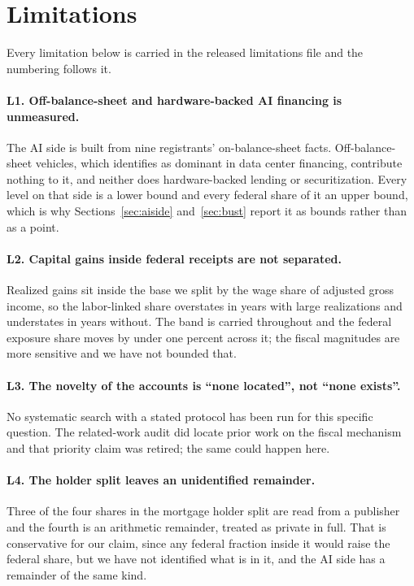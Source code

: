 \section{Limitations}
\label{sec:limitations}

Every limitation below is carried in the released limitations file and the numbering follows it.

\paragraph{L1. Off-balance-sheet and hardware-backed AI financing is unmeasured.} The AI side is
built from nine registrants' on-balance-sheet facts. Off-balance-sheet vehicles, which
\citet{BIS2026} identifies as dominant in data center financing, contribute nothing to it, and
neither does hardware-backed lending or securitization. Every level on that side is a lower bound
and every federal share of it an upper bound, which is why Sections~\ref{sec:aiside}
and~\ref{sec:bust} report it as bounds rather than as a point.

\paragraph{L2. Capital gains inside federal receipts are not separated.} Realized gains sit inside
the base we split by the wage share of adjusted gross income, so the labor-linked share overstates
in years with large realizations and understates in years without. The band is carried throughout
and the federal exposure share moves by under one percent across it; the fiscal magnitudes are
more sensitive and we have not bounded that.

\paragraph{L3. The novelty of the accounts is ``none located'', not ``none exists''.} No
systematic search with a stated protocol has been run for this specific question. The related-work
audit did locate prior work on the fiscal mechanism and that priority claim was retired; the same
could happen here.

\paragraph{L4. The holder split leaves an unidentified remainder.} Three of the four shares in the
mortgage holder split are read from a publisher and the fourth is an arithmetic remainder, treated
as private in full. That is conservative for our claim, since any federal fraction inside it would
raise the federal share, but we have not identified what is in it, and the AI side has a remainder
of the same kind.

